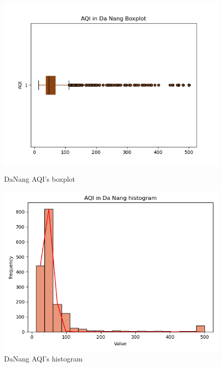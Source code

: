 \documentclass[conference]{IEEEtran}
\begin{document}
\begin{figure}[H]
    \centering
    \begin{minipage}{0.24\textwidth}
        \centering
        \includegraphics[width=1\textwidth]{bibliography/figure/Analysis-Dataset/BoxplotDaNang.png}
        \caption{DaNang AQI's boxplot}
        \label{fig:3}
    \end{minipage}
    \hfill
    \begin{minipage}{0.24\textwidth}
        \centering
        \includegraphics[width=1\textwidth]{bibliography/figure/Analysis-Dataset/histogramDaNang.png}
        \caption{DaNang AQI's histogram}
        \label{fig:4}
    \end{minipage}
\end{figure}
\end{document}
